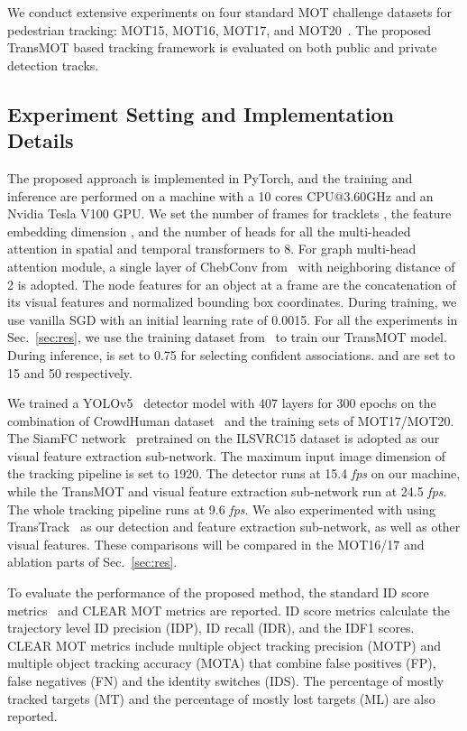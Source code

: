 \documentclass[10pt,twocolumn,letterpaper]{article}
\begin{document}
We conduct extensive experiments on four standard MOT challenge datasets for pedestrian tracking: MOT15\cite{MOTChallenge2015}, MOT16, MOT17, and MOT20~\cite{MOT16}. The proposed TransMOT based tracking framework is evaluated on both public and private detection tracks.


\subsection{Experiment Setting and Implementation Details}

The proposed approach is implemented in PyTorch, and the training and inference are performed on a machine with a 10 cores CPU@3.60GHz and an Nvidia Tesla V100 GPU. 
We set the number of frames for tracklets , the feature embedding dimension , and the number of heads for all the multi-headed attention in spatial and temporal transformers to 8. 
For graph multi-head attention module, a single layer of ChebConv from~\cite{defferrard2016convolutional} with neighboring distance of 2 is adopted. 
The node features for an object at a frame are the concatenation of its visual features and normalized bounding box coordinates.
During training, we use vanilla SGD with an initial learning rate of 0.0015. 
For all the experiments in Sec.~\ref{sec:res}, we use the training dataset from~\cite{lin2020human} to train our TransMOT model.
During inference,  is set to 0.75 for selecting confident associations. 
 and  are set to 15 and 50 respectively.

We trained a YOLOv5~\cite{yolov5} detector model with 407 layers for 300 epochs on the combination of CrowdHuman dataset~\cite{shao2018crowdhuman} and the training sets of MOT17/MOT20.
The SiamFC network~\cite{sadeghian2017tracking} pretrained on the ILSVRC15 dataset is adopted as our visual feature extraction sub-network. 
The maximum input image dimension of the tracking pipeline is set to 1920. The detector runs at 15.4 \textit{fps} on our machine, while the TransMOT and visual feature extraction sub-network run at 24.5 \textit{fps}. The whole tracking pipeline runs at 9.6 \textit{fps}. We also experimented with using TransTrack~\cite{sun2020transtrack} as our detection and feature extraction sub-network, as well as other visual features. These comparisons will be compared in the MOT16/17 and ablation parts of Sec.~\ref{sec:res}. 

To evaluate the performance of the proposed method, the standard ID score metrics~\cite{ristani2016performance} and CLEAR MOT metrics \cite{bernardin2008evaluating} are reported.
ID score metrics calculate the trajectory level ID precision (IDP), ID recall (IDR), and the IDF1 scores.
CLEAR MOT metrics include multiple object tracking precision (MOTP) and multiple object tracking accuracy (MOTA) that combine false positives (FP), false negatives (FN) and the identity switches (IDS). 
The percentage of mostly tracked targets (MT) and the percentage of mostly lost targets (ML) are also reported.
\end{document}
